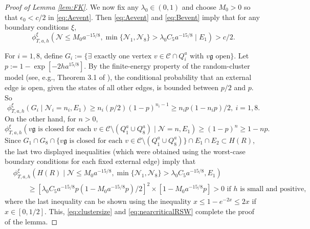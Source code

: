 \documentclass[article,12pt,reqno]{amsart}
\begin{document}
\begin{proof}[Proof of Lemma \ref{lem:FK}]
	
	We now fix any $\lambda_0\in(0,1)$ and choose $M_0>0$ so that $\epsilon_0<c/2$ in \eqref{eq:Aevent}. Then \eqref{eq:Aevent} and \eqref{eq:Bevent} imply that for any boundary conditions $\xi$,
	\begin{equation}\label{eq:clustersize}
		\phi_{T,a,h}^{\xi}(\mathcal{N} \leq M_0a^{-15/8},  \min\{\mathcal{N}_1, \mathcal{N}_8\}>\lambda_0 C_5 a^{-15/8} \mid E_1)>c/2.
	\end{equation}
	
	For $i=1,8$, define $G_i:=\{\exists \text{ exactly one vertex }v\in \mathscr{C}\cap Q^a_i \text{ with }v\mathfrak{g} \text{ open}\}$. Let $p:=1-\exp[-2ha^{15/8}]$. By the finite-energy property of the random-cluster model (see, e.g., Theorem 3.1 of \cite{Gri06}), the conditional probability that an external edge is open, given the states of all other edges, is bounded between $p/2$ and $p$. So
	\[\phi_{T,a,h}^{\xi}(G_i \mid \mathcal{N}_i=n_i, E_1)\geq n_i (p/2)(1-p)^{n_i-1}\geq n_ip(1-n_ip)/2,~i=1,8.\]
	On the other hand, for $n > 0$,
	\[\phi_{T,a,h}^{\xi}(v\mathfrak{g} \text{ is closed for each  }v \in \mathscr{C}\setminus(Q^a_1\cup Q^a_8) \mid \mathcal{N}=n, E_1)\geq (1-p)^n\geq 1-np.\]
	Since $G_1\cap G_8 \cap \{v\mathfrak{g} \text{ is closed for each  }v \in \mathscr{C}\setminus(Q^a_1\cup Q^a_8)\}\cap E_1 \cap E_2 \subset H(R)$, the last two displayed inequalities (which were obtained using the worst-case boundary conditions for each fixed external edge) imply that
	\begin{align*}
		&\phi_{T,a,h}^{\xi}(H(R) \mid \mathcal{N} \leq M_0a^{-15/8},  \min\{\mathcal{N}_1, \mathcal{N}_8\}>\lambda_0 C_5 a^{-15/8}, E_1)\\
		&\qquad \geq [\lambda_0 C_5a^{-15/8}p(1-M_0 a^{-15/8}p)/2]^2 \times[1-M_0a^{-15/8}p]>0 \text{ if } h \text{ is small and positive},
	\end{align*}
	where the last inequality can be shown using the inequality $x\leq 1-e^{-2x}\leq 2x$ if $x\in[0,1/2]$. This, \eqref{eq:clustersize} and \eqref{eq:nearcriticalRSW} complete the proof of the lemma.
	\end{proof}
\end{document}
